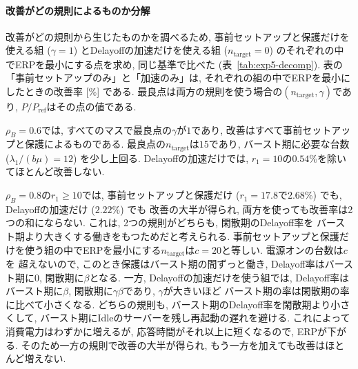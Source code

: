 \documentclass[a4paper, 11pt, dvipdfmx]{jsreport}
\begin{document}
\paragraph{改善がどの規則によるものか分解}
改善がどの規則から生じたものかを調べるため, 事前セットアップと保護だけを使える組 ($\gamma = 1$) とDelayoffの加速だけを使える組
($n_{\mathrm{target}} = 0$) のそれぞれの中でERPを最小にする点を求め, 同じ基準で比べた (表~\ref{tab:exp5-decomp}).
表の「事前セットアップのみ」と「加速のみ」は, それぞれの組の中でERPを最小にしたときの改善率 [\%] である.
最良点は両方の規則を使う場合の$(n_{\mathrm{target}}, \gamma)$であり, $P/P_{\mathrm{ref}}$はその点の値である.

$\rho_B = 0.6$では, すべてのマスで最良点の$\gamma$が$1$であり, 改善はすべて事前セットアップと保護によるものである.
最良点の$n_{\mathrm{target}}$は$15$であり, バースト期に必要な台数 ($\lambda_1/(b\mu) = 12$) を少し上回る.
Delayoffの加速だけでは, $r_1 = 10$の$0.54\%$を除いてほとんど改善しない. 

$\rho_B = 0.8$の$r_1 \ge 10$では, 事前セットアップと保護だけ ($r_1 = 17.8$で$2.68\%$) でも, Delayoffの加速だけ ($2.22\%$) でも
改善の大半が得られ, 両方を使っても改善率は2つの和にならない. これは, 2つの規則がどちらも, 閑散期のDelayoff率を
バースト期より大きくする働きをもつためだと考えられる.
事前セットアップと保護だけを使う組の中でERPを最小にする$n_{\mathrm{target}}$は$c = 20$と等しい. 電源オンの台数は$c$を
超えないので, このとき保護はバースト期の間ずっと働き, Delayoff率はバースト期に$0$, 閑散期に$\beta$となる.
一方, Delayoffの加速だけを使う組では, Delayoff率はバースト期に$\beta$, 閑散期に$\gamma\beta$であり, $\gamma$が大きいほど
バースト期の率は閑散期の率に比べて小さくなる. どちらの規則も, バースト期のDelayoff率を閑散期より小さくして,
バースト期にIdleのサーバーを残し再起動の遅れを避ける. これによって消費電力はわずかに増えるが, 応答時間がそれ以上に短くなるので,
ERPが下がる. そのため一方の規則で改善の大半が得られ, もう一方を加えても改善はほとんど増えない.
\end{document}
